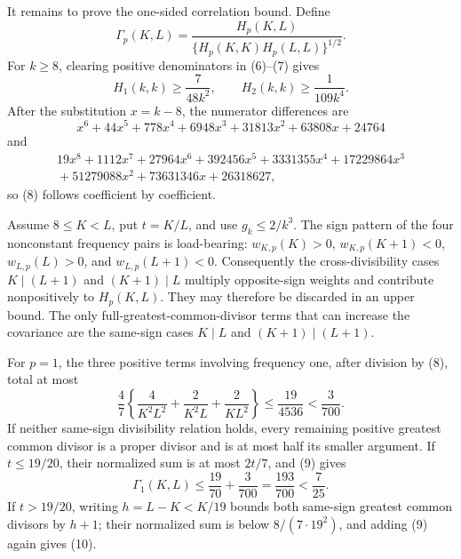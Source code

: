 It remains to prove the one-sided correlation bound.  Define
\[
 \Gamma_p(K,L)=\frac{H_p(K,L)}{\{H_p(K,K)H_p(L,L)\}^{1/2}}.
\]
For \(k\geq8\), clearing positive denominators in (6)--(7) gives
\[
 H_1(k,k)\geq\frac7{48k^2},\qquad H_2(k,k)\geq\frac1{109k^4}.           \tag{8}
\]
After the substitution \(x=k-8\), the numerator differences are
\[
 x^6+44x^5+778x^4+6948x^3+31813x^2+63808x+24764
\]
and
\[
 \begin{aligned}
 19x^8+1112x^7+27964x^6+392456x^5+3331355x^4+17229864x^3\\
 {}+51279088x^2+73631346x+26318627,
 \end{aligned}
\]
so (8) follows coefficient by coefficient.

Assume \(8\leq K<L\), put \(t=K/L\), and use \(g_k\leq2/k^3\).  The sign pattern of the four nonconstant frequency pairs is load-bearing: \(w_{K,p}(K)>0\), \(w_{K,p}(K+1)<0\), \(w_{L,p}(L)>0\), and \(w_{L,p}(L+1)<0\).  Consequently the cross-divisibility cases \(K\mid(L+1)\) and \((K+1)\mid L\) multiply opposite-sign weights and contribute nonpositively to \(H_p(K,L)\).  They may therefore be discarded in an upper bound.  The only full-greatest-common-divisor terms that can increase the covariance are the same-sign cases \(K\mid L\) and \((K+1)\mid(L+1)\).

For \(p=1\), the three positive terms involving frequency one, after division by (8), total at most
\[
 \frac47\left\{\frac4{K^2L^2}+\frac2{K^2L}+\frac2{KL^2}\right\}
 \leq\frac{19}{4536}<\frac3{700}.                                      \tag{9}
\]
If neither same-sign divisibility relation holds, every remaining positive greatest common divisor is a proper divisor and is at most half its smaller argument.  If \(t\leq19/20\), their normalized sum is at most \(2t/7\), and (9) gives
\[
 \Gamma_1(K,L)\leq\frac{19}{70}+\frac3{700}=\frac{193}{700}<\frac7{25}. \tag{10}
\]
If \(t>19/20\), writing \(h=L-K<K/19\) bounds both same-sign greatest common divisors by \(h+1\); their normalized sum is below \(8/(7\cdot19^2)\), and adding (9) again gives (10).

